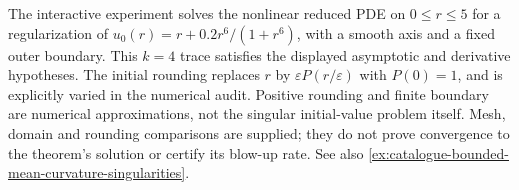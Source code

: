\begin{example}
The interactive experiment solves the nonlinear reduced PDE on $0\leq r\leq5$ for a regularization of $u_0(r)=r+0.2r^6/(1+r^6)$, with a smooth axis and a fixed outer boundary. This $k=4$ trace satisfies the displayed asymptotic and derivative hypotheses. The initial rounding replaces $r$ by $\varepsilon P(r/\varepsilon)$ with $P(0)=1$, and is explicitly varied in the numerical audit. Positive rounding and finite boundary are numerical approximations, not the singular initial-value problem itself. Mesh, domain and rounding comparisons are supplied; they do not prove convergence to the theorem's solution or certify its blow-up rate. See also \ref{ex:catalogue-bounded-mean-curvature-singularities}.
\end{example}
